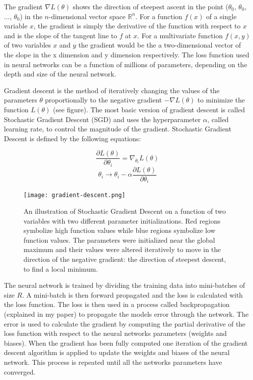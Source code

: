 \documentclass[17pt]{extarticle}
\newcommand*{\pd}[2]{\ensuremath{\dfrac{\partial #1}{\partial #2}}}
\begin{document}
The gradient $\nabla L(\theta)$ shows the direction of steepest ascent in the point ($\theta_{0}$, $\theta_{0}$, ..., $\theta_{0}$) in the $n$-dimensional vector space $\mathbb{R}^{n}$. For a function $f(x)$ of a single variable $x$, the gradient is simply the derivative of the function with respect to $x$ and is the slope of the tangent line to $f$ at $x$. For a multivariate function $f(x,y)$ of two variables $x$ and $y$ the gradient would be the a two-dimensional vector of the slope in the x dimension and y dimension respectively. The loss function used in neural networks can be a function of millions of parameters, depending on the depth and size of the neural network. 

Gradient descent is the method of iteratively changing the values of the parameters $\theta$ proportionally to the negative gradient $-\nabla L(\theta)$ to minimize the function $L(\theta)$ (see figure). The most basic version of gradient descent is called Stochastic Gradient Descent (SGD) and uses the hyperparameter $\alpha$, called learning rate, to control the magnitude of the gradient. Stochastic Gradient Descent is defined by the following equations:

\begin{equation*}\label{EQgradient}
\pd{L(\theta)}{\theta_i} = \nabla_{\theta_i} L(\theta)
\end{equation*}
\begin{equation*}\label{SGD}
{\theta_i} \to {\theta_i} - \alpha \pd{L(\theta)}{\theta_i}
\end{equation*}
\begin{figure}[h]
  		\texttt{[image: gradient-descent.png]}

{An illustration of Stochastic Gradient Descent on a function of two variables with two different parameter initializations. Red regions symbolize high function values while blue regions symbolize low function values. The parameters were initialized near the global maximum and their values were altered iteratively to move in the direction of the negative gradient: the direction of steepest descent, to find a local minimum.} \label{figSGD}
\end{figure}

\newpage


The neural network is trained by dividing the training data into mini-batches of size $R$. A mini-batch is then forward propagated and the loss is calculated with the loss function. The loss is then used in a process called backpropagation (explained in my paper) to propagate the models error through the network. The error is used to calculate the gradient by computing the partial derivative of the loss function with respect to the neural networks parameters (weights and biases). When the gradient has been fully computed one iteration of the gradient descent algorithm is applied to update the weights and biases of the neural network. This process is repeated until all the networks parameters have converged.
  	
\end{document}
